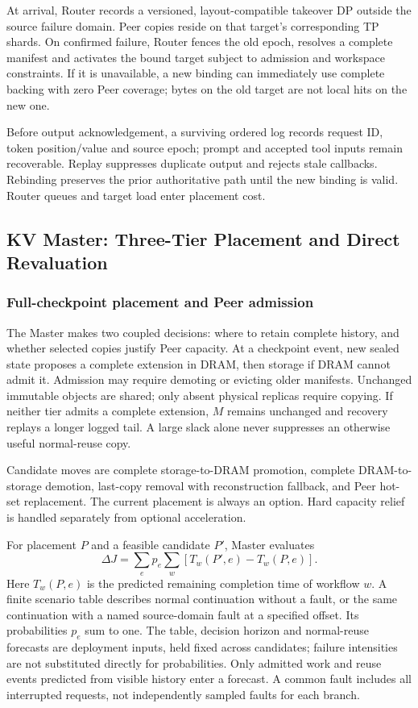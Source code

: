 At arrival, Router records a versioned, layout-compatible takeover DP
outside the source failure domain. Peer copies reside on that target's
corresponding TP shards. On confirmed failure, Router fences the old
epoch, resolves a complete manifest and activates the bound target subject
to admission and workspace constraints. If it is unavailable, a new
binding can immediately use complete backing with zero Peer coverage;
bytes on the old target are not local hits on the new one.

Before output acknowledgement, a surviving ordered log records request
ID, token position/value and source epoch; prompt and accepted tool inputs
remain recoverable. Replay suppresses duplicate output and rejects stale
callbacks. Rebinding preserves the prior authoritative path until the new
binding is valid. Router queues and target load enter placement cost.

\subsection{KV Master: Three-Tier Placement and Direct Revaluation}
\label{sec:kv-master}

\subsubsection{Full-checkpoint placement and Peer admission}
\label{sec:placement-value}

The Master makes two coupled decisions: where to retain complete history,
and whether selected copies justify Peer capacity. At a checkpoint event,
new sealed state proposes a complete extension in DRAM, then storage if
DRAM cannot admit it. Admission may require demoting or evicting older
manifests. Unchanged immutable objects are shared; only absent physical
replicas require copying. If neither tier admits a complete extension,
$M$ remains unchanged and recovery replays a longer logged tail. A large
slack alone never suppresses an otherwise useful normal-reuse copy.

Candidate moves are complete storage-to-DRAM promotion, complete
DRAM-to-storage demotion, last-copy removal with reconstruction fallback,
and Peer hot-set replacement. The current placement is always an option.
Hard capacity relief is handled separately from optional acceleration.

For placement $P$ and a feasible candidate $P'$, Master evaluates
\begin{equation}
 \Delta J=\sum_e p_e\sum_w
       [T_w(P',e)-T_w(P,e)].
 \label{eq:value}
\end{equation}
Here $T_w(P,e)$ is the predicted remaining completion time of workflow
$w$. A finite scenario table describes normal continuation without a
fault, or the same continuation with a named source-domain fault at a
specified offset. Its probabilities $p_e$ sum to one. The table, decision
horizon and normal-reuse forecasts are deployment inputs, held fixed
across candidates; failure intensities are not substituted directly for
probabilities. Only admitted work and reuse events predicted from visible
history enter a forecast. A common fault includes all interrupted
requests, not independently sampled faults for each branch.

